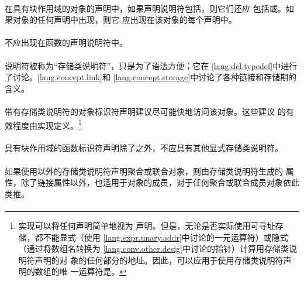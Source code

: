 \paragraph{}
在具有块作用域的对象的声明中，如果声明说明符包括，则它们还应
包括或。如果对象的任何声明中出现，则它
应出现在该对象的每个声明中。

\paragraph{}
不应出现在函数的声明说明符中。

\semantic
\paragraph{}
说明符被称为``存储类说明符''，只是为了语法方便；它在
\ref{lang.dcl.typedef}中进行了讨论。\ref{lang.concept.link}和
\ref{lang.concept.storage}中讨论了各种链接和存储期的含义。

\paragraph{}
带有存储类说明符的对象标识符声明建议尽可能快地访问该对象。这些建议
的有效程度由实现定义。\footnote{实现可以将任何声明简单地视为
声明。但是，无论是否实际使用可寻址存储，都不能显式（使用
\ref{lang.expr.unary.addr}中讨论的一元运算符）或隐式（通过将数组名转换为
\ref{lang.conv.other.desig}中讨论的指针）计算用存储类说明符声明的对
象的任何部分的地址。因此，可以应用于使用存储类说明符声明的数组的唯
一运算符是。}

\paragraph{}
具有块作用域的函数标识符声明除了之外，不应具有其他显式存储类说明符。

\paragraph{}
如果使用以外的存储类说明符声明聚合或联合对象，则由存储类说明符生成的
属性，除了链接属性以外，也适用于对象的成员，对于任何聚合或联合成员对象依此类推。


\syntax
\paragraph{}


